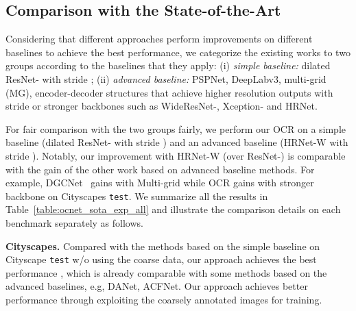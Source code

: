 \documentclass[runningheads]{llncs}
\begin{document}
\subsection{Comparison with the State-of-the-Art}
Considering that different approaches perform improvements on different baselines to achieve the best performance,
we categorize the existing works to two groups according to the baselines that they apply: (i) \emph{simple baseline:} dilated ResNet- with stride ;
(ii) \emph{advanced baseline:} PSPNet, DeepLabv3, multi-grid (MG), encoder-decoder structures that achieve higher resolution outputs with stride  or stronger backbones such as WideResNet-, Xception- and HRNet.

For fair comparison with the two groups fairly,
we perform our OCR on a simple baseline (dilated ResNet- with stride )
and an advanced baseline (HRNet-W with stride ).
Notably, our improvement with HRNet-W (over ResNet-) is comparable with 
the gain of the other work based on advanced baseline methods.
For example, DGCNet~\cite{zhang2019dual} gains  with Multi-grid
while OCR gains  with stronger backbone on Cityscapes \texttt{test}.
We summarize all the results in Table~\ref{table:ocnet_sota_exp_all}
and illustrate the comparison details on each benchmark separately as follows.


\noindent\textbf{Cityscapes.}
Compared with the methods based on 
the simple baseline on Cityscape \texttt{test}
w/o using the coarse data,
our approach achieves the best performance , which is already 
comparable with some methods based on the advanced baselines, e.g, DANet, ACFNet.
Our approach achieves better performance  through exploiting 
the coarsely annotated images for training.
\end{document}
